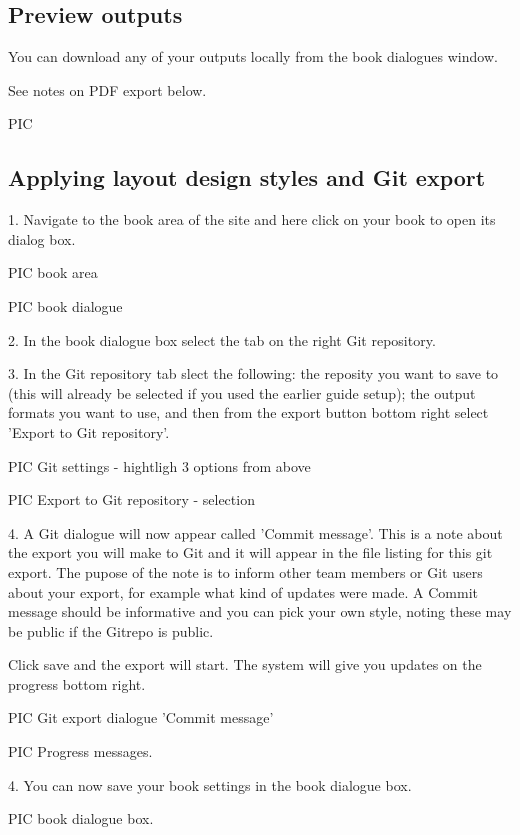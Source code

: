 \documentclass{article}
\begin{document}
\subsection{Preview outputs}\label{H5954601}



You can download any of your outputs locally from the book dialogues window.


See notes on PDF export below.


PIC 


\subsection{Applying layout design styles and Git export}\label{H2238943}



1. Navigate to the book area of the site and here click on your book to open its dialog box.


PIC book area


PIC book dialogue


2. In the book dialogue box select the tab on the right Git repository.


3. In the Git repository tab slect the following: the reposity you want to save to (this will already be selected if you used the earlier guide setup); the output formats you want to use, and then from the export button bottom right select 'Export to Git repository'.


PIC Git settings - hightligh 3 options from above


PIC Export to Git repository - selection


4. A Git dialogue will now appear called 'Commit message'. This is a note about the export you will make to Git and it will appear in the file listing for this git export. The pupose of the note is to inform other team members or Git users about your export, for example what kind of updates were made. A Commit message should be informative and you can pick your own style, noting these may be public if the Gitrepo is public.   


Click save and the export will start. The system will give you updates on the progress bottom right.


PIC Git export dialogue  'Commit message'


PIC Progress messages.


4. You can now save your book settings in the book dialogue box.


PIC book dialogue box.
\end{document}
